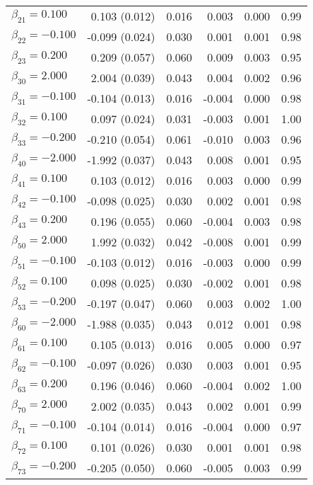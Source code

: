\begin{table}[ht]
\begin{tabular}{l|rrrrr}
  $\beta_{21} = 0.100$ &  0.103 (0.012) & 0.016 &  0.003 & 0.000 & 0.99 \\ 
  $\beta_{22} = -0.100$ & -0.099 (0.024) & 0.030 &  0.001 & 0.001 & 0.98 \\ 
  $\beta_{23} = 0.200$ &  0.209 (0.057) & 0.060 &  0.009 & 0.003 & 0.95 \\ 
  $\beta_{30} = 2.000$ &  2.004 (0.039) & 0.043 &  0.004 & 0.002 & 0.96 \\ 
  $\beta_{31} = -0.100$ & -0.104 (0.013) & 0.016 & -0.004 & 0.000 & 0.98 \\ 
  $\beta_{32} = 0.100$ &  0.097 (0.024) & 0.031 & -0.003 & 0.001 & 1.00 \\ 
  $\beta_{33} = -0.200$ & -0.210 (0.054) & 0.061 & -0.010 & 0.003 & 0.96 \\ 
  $\beta_{40} = -2.000$ & -1.992 (0.037) & 0.043 &  0.008 & 0.001 & 0.95 \\ 
  $\beta_{41} = 0.100$ &  0.103 (0.012) & 0.016 &  0.003 & 0.000 & 0.99 \\ 
  $\beta_{42} = -0.100$ & -0.098 (0.025) & 0.030 &  0.002 & 0.001 & 0.98 \\ 
  $\beta_{43} = 0.200$ &  0.196 (0.055) & 0.060 & -0.004 & 0.003 & 0.98 \\ 
  $\beta_{50} = 2.000$ &  1.992 (0.032) & 0.042 & -0.008 & 0.001 & 0.99 \\ 
  $\beta_{51} = -0.100$ & -0.103 (0.012) & 0.016 & -0.003 & 0.000 & 0.99 \\ 
  $\beta_{52} = 0.100$ &  0.098 (0.025) & 0.030 & -0.002 & 0.001 & 0.98 \\ 
  $\beta_{53} = -0.200$ & -0.197 (0.047) & 0.060 &  0.003 & 0.002 & 1.00 \\ 
  $\beta_{60} = -2.000$ & -1.988 (0.035) & 0.043 &  0.012 & 0.001 & 0.98 \\ 
  $\beta_{61} = 0.100$ &  0.105 (0.013) & 0.016 &  0.005 & 0.000 & 0.97 \\ 
  $\beta_{62} = -0.100$ & -0.097 (0.026) & 0.030 &  0.003 & 0.001 & 0.95 \\ 
  $\beta_{63} = 0.200$ &  0.196 (0.046) & 0.060 & -0.004 & 0.002 & 1.00 \\ 
  $\beta_{70} = 2.000$ &  2.002 (0.035) & 0.043 &  0.002 & 0.001 & 0.99 \\ 
  $\beta_{71} = -0.100$ & -0.104 (0.014) & 0.016 & -0.004 & 0.000 & 0.97 \\ 
  $\beta_{72} = 0.100$ &  0.101 (0.026) & 0.030 &  0.001 & 0.001 & 0.98 \\ 
  $\beta_{73} = -0.200$ & -0.205 (0.050) & 0.060 & -0.005 & 0.003 & 0.99 \\ 

\end{tabular}
\end{table}
